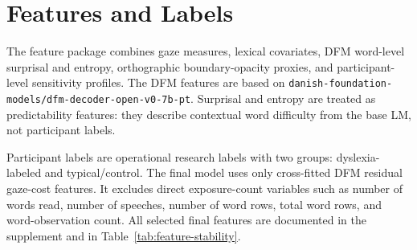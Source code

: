 \section{Features and Labels}
The feature package combines gaze measures, lexical covariates, DFM word-level
surprisal and entropy, orthographic boundary-opacity proxies, and participant-level
sensitivity profiles. The DFM features are based on
\texttt{danish-foundation-models/dfm-decoder-open-v0-7b-pt}. Surprisal and entropy are
treated as predictability features: they describe contextual word difficulty from the
base LM, not participant labels.

Participant labels are operational research labels with two groups:
dyslexia-labeled and typical/control. The final model uses only cross-fitted DFM
residual gaze-cost features. It excludes direct exposure-count variables such as number
of words read, number of speeches, number of word rows, total word rows, and
word-observation count. All selected final features are documented in the supplement
and in Table~\ref{tab:feature-stability}.
